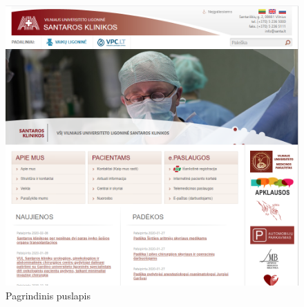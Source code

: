 \documentclass{VUMIFPSbakalaurinis}
\begin{document}

\appendix  %

\begin{figure}[H]
    \centering
    \includegraphics[scale=0.65]{img/Pagrindinis}
    \caption{Pagrindinis puslapis}
    \label{img:PagrindinisPuslapis}
\end{figure}
\end{document}
